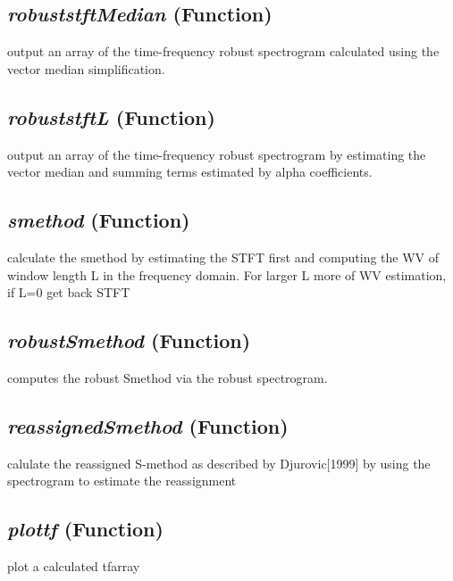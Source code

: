 \subsection{\textit{robuststftMedian} (Function)}
\label{ssec:processing.tftools.robuststftMedian}

output an array 
    of the time-frequency robust spectrogram calculated using the vector median
    simplification.


\subsection{\textit{robuststftL} (Function)}
\label{ssec:processing.tftools.robuststftL}

output an array of the
    time-frequency robust spectrogram by estimating the vector median and 
    summing terms estimated by alpha coefficients.

\subsection{\textit{smethod} (Function)}
\label{ssec:processing.tftools.smethod}

calculate
    the smethod by estimating the STFT first and computing the WV of window 
    length L in the frequency domain.  For larger L more of WV estimation, if 
    L=0 get back STFT

\subsection{\textit{robustSmethod} (Function)}
\label{ssec:processing.tftools.robustSmethod}

computes the 
    robust Smethod via the robust spectrogram.

\subsection{\textit{reassignedSmethod} (Function)}
\label{ssec:processing.tftools.reassignedSmethod}

calulate the reassigned S-method as described by Djurovic[1999] by 
    using the spectrogram to estimate the reassignment

\subsection{\textit{plottf} (Function)}
\label{ssec:processing.tftools.plottf}

plot a calculated tfarray 

